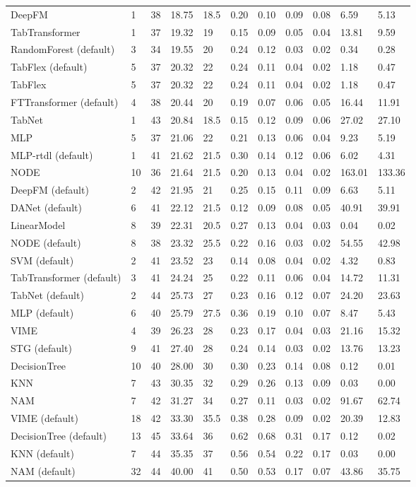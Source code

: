 \begin{tabular}{lllllllllll}
DeepFM & 1 & 38 & 18.75 & 18.5 & 0.20 & 0.10 & 0.09 & 0.08 & 6.59 & 5.13 \\
TabTransformer & 1 & 37 & 19.32 & 19 & 0.15 & 0.09 & 0.05 & 0.04 & 13.81 & 9.59 \\
RandomForest (default) & 3 & 34 & 19.55 & 20 & 0.24 & 0.12 & 0.03 & 0.02 & 0.34 & 0.28 \\
TabFlex (default) & 5 & 37 & 20.32 & 22 & 0.24 & 0.11 & 0.04 & 0.02 & 1.18 & 0.47 \\
TabFlex & 5 & 37 & 20.32 & 22 & 0.24 & 0.11 & 0.04 & 0.02 & 1.18 & 0.47 \\
FTTransformer (default) & 4 & 38 & 20.44 & 20 & 0.19 & 0.07 & 0.06 & 0.05 & 16.44 & 11.91 \\
TabNet & 1 & 43 & 20.84 & 18.5 & 0.15 & 0.12 & 0.09 & 0.06 & 27.02 & 27.10 \\
MLP & 5 & 37 & 21.06 & 22 & 0.21 & 0.13 & 0.06 & 0.04 & 9.23 & 5.19 \\
MLP-rtdl (default) & 1 & 41 & 21.62 & 21.5 & 0.30 & 0.14 & 0.12 & 0.06 & 6.02 & 4.31 \\
NODE & 10 & 36 & 21.64 & 21.5 & 0.20 & 0.13 & 0.04 & 0.02 & 163.01 & 133.36 \\
DeepFM (default) & 2 & 42 & 21.95 & 21 & 0.25 & 0.15 & 0.11 & 0.09 & 6.63 & 5.11 \\
DANet (default) & 6 & 41 & 22.12 & 21.5 & 0.12 & 0.09 & 0.08 & 0.05 & 40.91 & 39.91 \\
LinearModel & 8 & 39 & 22.31 & 20.5 & 0.27 & 0.13 & 0.04 & 0.03 & 0.04 & 0.02 \\
NODE (default) & 8 & 38 & 23.32 & 25.5 & 0.22 & 0.16 & 0.03 & 0.02 & 54.55 & 42.98 \\
SVM (default) & 2 & 41 & 23.52 & 23 & 0.14 & 0.08 & 0.04 & 0.02 & 4.32 & 0.83 \\
TabTransformer (default) & 3 & 41 & 24.24 & 25 & 0.22 & 0.11 & 0.06 & 0.04 & 14.72 & 11.31 \\
TabNet (default) & 2 & 44 & 25.73 & 27 & 0.23 & 0.16 & 0.12 & 0.07 & 24.20 & 23.63 \\
MLP (default) & 6 & 40 & 25.79 & 27.5 & 0.36 & 0.19 & 0.10 & 0.07 & 8.47 & 5.43 \\
VIME & 4 & 39 & 26.23 & 28 & 0.23 & 0.17 & 0.04 & 0.03 & 21.16 & 15.32 \\
STG (default) & 9 & 41 & 27.40 & 28 & 0.24 & 0.14 & 0.03 & 0.02 & 13.76 & 13.23 \\
DecisionTree & 10 & 40 & 28.00 & 30 & 0.30 & 0.23 & 0.14 & 0.08 & 0.12 & 0.01 \\
KNN & 7 & 43 & 30.35 & 32 & 0.29 & 0.26 & 0.13 & 0.09 & 0.03 & 0.00 \\
NAM & 7 & 42 & 31.27 & 34 & 0.27 & 0.11 & 0.03 & 0.02 & 91.67 & 62.74 \\
VIME (default) & 18 & 42 & 33.30 & 35.5 & 0.38 & 0.28 & 0.09 & 0.02 & 20.39 & 12.83 \\
DecisionTree (default) & 13 & 45 & 33.64 & 36 & 0.62 & 0.68 & 0.31 & 0.17 & 0.12 & 0.02 \\
KNN (default) & 7 & 44 & 35.35 & 37 & 0.56 & 0.54 & 0.22 & 0.17 & 0.03 & 0.00 \\
NAM (default) & 32 & 44 & 40.00 & 41 & 0.50 & 0.53 & 0.17 & 0.07 & 43.86 & 35.75 \\
\bottomrule
\end{tabular}
